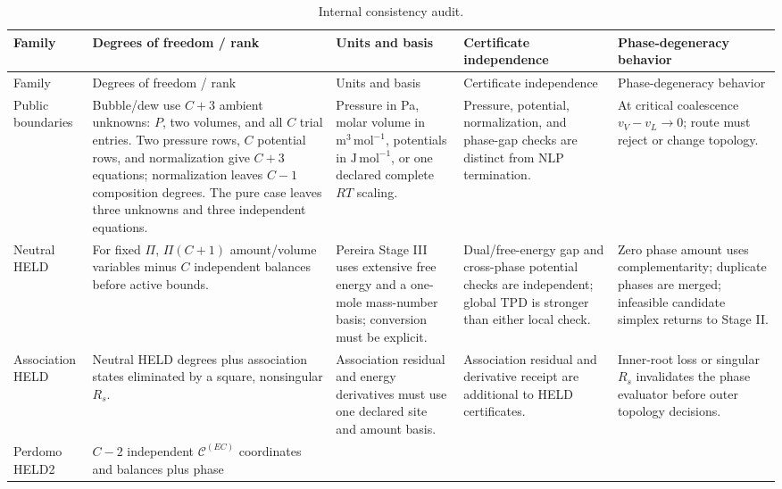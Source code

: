 \documentclass[11pt]{article}
\begin{document}
\small
\begin{longtable}{>{\raggedright\arraybackslash}p{}
                  >{\raggedright\arraybackslash}p{}
                  >{\raggedright\arraybackslash}p{}
                  >{\raggedright\arraybackslash}p{}
                  >{\raggedright\arraybackslash}p{}}
\caption{Internal consistency audit.}
\label{tab:eqform:consistency}\\
\toprule
Family & Degrees of freedom / rank & Units and basis &
Certificate independence & Phase-degeneracy behavior \\
\midrule
\endfirsthead
\toprule
Family & Degrees of freedom / rank & Units and basis &
Certificate independence & Phase-degeneracy behavior \\
\midrule
\endhead
Public boundaries &
Bubble/dew use \(C+3\) ambient unknowns: \(P\), two volumes, and all \(C\)
trial entries. Two pressure rows, \(C\) potential rows, and normalization give
\(C+3\) equations; normalization leaves \(C-1\) composition degrees. The pure
case leaves three unknowns and three independent equations. &
Pressure in Pa, molar volume in \(\mathrm{m^3\,mol^{-1}}\), potentials in
\(\mathrm{J\,mol^{-1}}\), or one declared complete \(RT\) scaling. &
Pressure, potential, normalization, and phase-gap checks are distinct from NLP
termination. &
At critical coalescence \(v_V-v_L\to0\); route must reject or change topology. \\
\addlinespace
Neutral HELD &
For fixed \(\Pi\), \(\Pi(C+1)\) amount/volume variables minus \(C\) independent
balances before active bounds. &
Pereira Stage III uses extensive free energy and a one-mole mass-number basis;
conversion must be explicit. &
Dual/free-energy gap and cross-phase potential checks are independent; global
TPD is stronger than either local check. &
Zero phase amount uses complementarity; duplicate phases are merged; infeasible
candidate simplex returns to Stage II. \\
\addlinespace
Association HELD &
Neutral HELD degrees plus association states eliminated by a square,
nonsingular \(R_s\). &
Association residual and energy derivatives must use one declared site and
amount basis. &
Association residual and derivative receipt are additional to HELD
certificates. &
Inner-root loss or singular \(R_s\) invalidates the phase evaluator before
outer topology decisions. \\
\addlinespace
Perdomo HELD2 &
\(C-2\) independent \(\mathcal C^{(EC)}\) coordinates and balances plus phase

\end{longtable}
\end{document}
